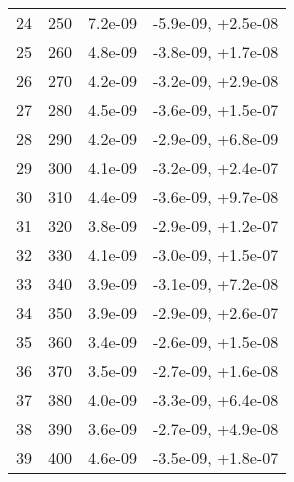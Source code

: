 \begin{table}
\begin{adjustbox}{width=1\textwidth/2}
\begin{tabular}{|c|c|c|c|}
\cline{1-4}
24 & 250 & 7.2e-09 & -5.9e-09, +2.5e-08 \\
\cline{1-4}
25 & 260 & 4.8e-09 & -3.8e-09, +1.7e-08 \\
\cline{1-4}
26 & 270 & 4.2e-09 & -3.2e-09, +2.9e-08 \\
\cline{1-4}
27 & 280 & 4.5e-09 & -3.6e-09, +1.5e-07 \\
\cline{1-4}
28 & 290 & 4.2e-09 & -2.9e-09, +6.8e-09 \\
\cline{1-4}
29 & 300 & 4.1e-09 & -3.2e-09, +2.4e-07 \\
\cline{1-4}
30 & 310 & 4.4e-09 & -3.6e-09, +9.7e-08 \\
\cline{1-4}
31 & 320 & 3.8e-09 & -2.9e-09, +1.2e-07 \\
\cline{1-4}
32 & 330 & 4.1e-09 & -3.0e-09, +1.5e-07 \\
\cline{1-4}
33 & 340 & 3.9e-09 & -3.1e-09, +7.2e-08 \\
\cline{1-4}
34 & 350 & 3.9e-09 & -2.9e-09, +2.6e-07 \\
\cline{1-4}
35 & 360 & 3.4e-09 & -2.6e-09, +1.5e-08 \\
\cline{1-4}
36 & 370 & 3.5e-09 & -2.7e-09, +1.6e-08 \\
\cline{1-4}
37 & 380 & 4.0e-09 & -3.3e-09, +6.4e-08 \\
\cline{1-4}
38 & 390 & 3.6e-09 & -2.7e-09, +4.9e-08 \\
\cline{1-4}
39 & 400 & 4.6e-09 & -3.5e-09, +1.8e-07 \\
\cline{1-4}
\end{tabular}
\end{adjustbox}
\end{table}

